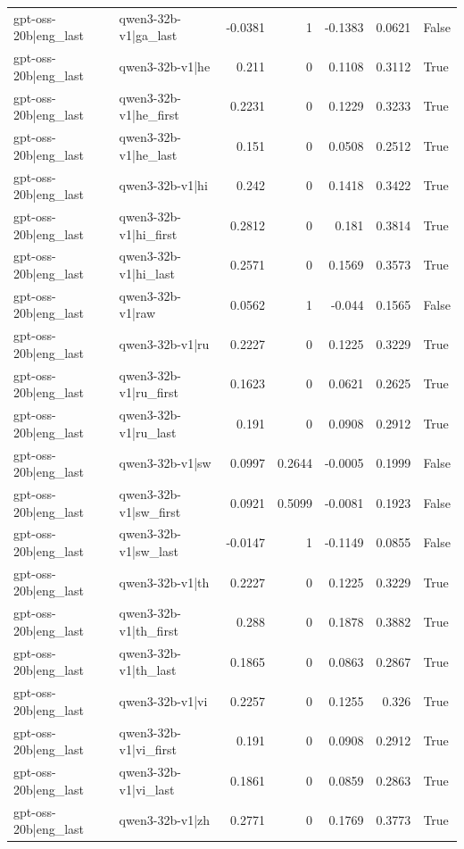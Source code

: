 \begin{table}
\begin{tabular}{l l r r r r l}
gpt-oss-20b|eng_last & qwen3-32b-v1|ga_last & -0.0381 & 1 & -0.1383 & 0.0621 & False \\
gpt-oss-20b|eng_last & qwen3-32b-v1|he & 0.211 & 0 & 0.1108 & 0.3112 & True \\
gpt-oss-20b|eng_last & qwen3-32b-v1|he_first & 0.2231 & 0 & 0.1229 & 0.3233 & True \\
gpt-oss-20b|eng_last & qwen3-32b-v1|he_last & 0.151 & 0 & 0.0508 & 0.2512 & True \\
gpt-oss-20b|eng_last & qwen3-32b-v1|hi & 0.242 & 0 & 0.1418 & 0.3422 & True \\
gpt-oss-20b|eng_last & qwen3-32b-v1|hi_first & 0.2812 & 0 & 0.181 & 0.3814 & True \\
gpt-oss-20b|eng_last & qwen3-32b-v1|hi_last & 0.2571 & 0 & 0.1569 & 0.3573 & True \\
gpt-oss-20b|eng_last & qwen3-32b-v1|raw & 0.0562 & 1 & -0.044 & 0.1565 & False \\
gpt-oss-20b|eng_last & qwen3-32b-v1|ru & 0.2227 & 0 & 0.1225 & 0.3229 & True \\
gpt-oss-20b|eng_last & qwen3-32b-v1|ru_first & 0.1623 & 0 & 0.0621 & 0.2625 & True \\
gpt-oss-20b|eng_last & qwen3-32b-v1|ru_last & 0.191 & 0 & 0.0908 & 0.2912 & True \\
gpt-oss-20b|eng_last & qwen3-32b-v1|sw & 0.0997 & 0.2644 & -0.0005 & 0.1999 & False \\
gpt-oss-20b|eng_last & qwen3-32b-v1|sw_first & 0.0921 & 0.5099 & -0.0081 & 0.1923 & False \\
gpt-oss-20b|eng_last & qwen3-32b-v1|sw_last & -0.0147 & 1 & -0.1149 & 0.0855 & False \\
gpt-oss-20b|eng_last & qwen3-32b-v1|th & 0.2227 & 0 & 0.1225 & 0.3229 & True \\
gpt-oss-20b|eng_last & qwen3-32b-v1|th_first & 0.288 & 0 & 0.1878 & 0.3882 & True \\
gpt-oss-20b|eng_last & qwen3-32b-v1|th_last & 0.1865 & 0 & 0.0863 & 0.2867 & True \\
gpt-oss-20b|eng_last & qwen3-32b-v1|vi & 0.2257 & 0 & 0.1255 & 0.326 & True \\
gpt-oss-20b|eng_last & qwen3-32b-v1|vi_first & 0.191 & 0 & 0.0908 & 0.2912 & True \\
gpt-oss-20b|eng_last & qwen3-32b-v1|vi_last & 0.1861 & 0 & 0.0859 & 0.2863 & True \\
gpt-oss-20b|eng_last & qwen3-32b-v1|zh & 0.2771 & 0 & 0.1769 & 0.3773 & True \\

\end{tabular}
\end{table}
